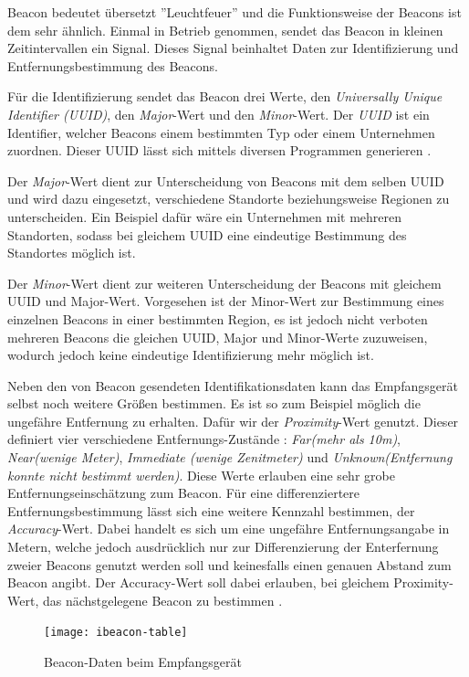 Beacon bedeutet übersetzt ''Leuchtfeuer'' und die Funktionsweise der Beacons ist dem sehr ähnlich.
Einmal in Betrieb genommen, sendet das Beacon in kleinen Zeitintervallen ein Signal. Dieses Signal beinhaltet Daten zur Identifizierung und Entfernungsbestimmung des Beacons.

Für die Identifizierung sendet das Beacon drei Werte, den \emph{Universally Unique Identifier (UUID)}, den \emph{Major}-Wert und den \emph{Minor}-Wert.
Der \emph{UUID} ist ein Identifier, welcher Beacons einem bestimmten Typ oder einem Unternehmen zuordnen. Dieser UUID lässt sich mittels diversen Programmen generieren \cite{uuidgen}.

Der \emph{Major}-Wert dient zur Unterscheidung von Beacons mit dem selben UUID und wird dazu eingesetzt, verschiedene Standorte beziehungsweise Regionen zu unterscheiden. Ein Beispiel dafür wäre ein Unternehmen mit mehreren Standorten, sodass bei gleichem UUID eine eindeutige Bestimmung des Standortes möglich ist.

Der \emph{Minor}-Wert dient zur weiteren Unterscheidung der Beacons mit gleichem UUID und Major-Wert. Vorgesehen ist der Minor-Wert zur Bestimmung eines einzelnen Beacons in einer bestimmten Region, es ist jedoch nicht verboten mehreren Beacons die gleichen UUID, Major und Minor-Werte zuzuweisen, wodurch jedoch keine eindeutige Identifizierung mehr möglich ist. 

Neben den von Beacon gesendeten Identifikationsdaten kann das Empfangsgerät selbst noch weitere Größen bestimmen. Es ist so zum Beispiel möglich die ungefähre Entfernung zu erhalten. 
Dafür wir der \emph{Proximity}-Wert genutzt. Dieser definiert vier verschiedene Entfernungs-Zustände : \textit{Far(mehr als 10m)}, \textit{Near(wenige Meter)}, \textit{Immediate (wenige Zenitmeter)} und \textit{Unknown(Entfernung konnte nicht bestimmt werden)}. 
Diese Werte erlauben eine sehr grobe Entfernungseinschätzung zum Beacon. 
Für eine differenziertere Entfernungsbestimmung lässt sich eine weitere Kennzahl bestimmen, der \textit{Accuracy}-Wert. Dabei handelt es sich um eine ungefähre Entfernungsangabe in Metern, welche jedoch ausdrücklich nur zur Differenzierung der Enterfernung zweier Beacons genutzt werden soll und keinesfalls einen genauen Abstand zum Beacon angibt. Der Accuracy-Wert soll dabei erlauben, bei gleichem Proximity-Wert, das nächstgelegene Beacon zu bestimmen \cite{clbeaconref}.

\begin{figure}[htb!]
		\centering
	\texttt{[image: ibeacon-table]}
	\caption{Beacon-Daten beim Empfangsgerät}
	\label{ibeacon-table}
\end{figure}


